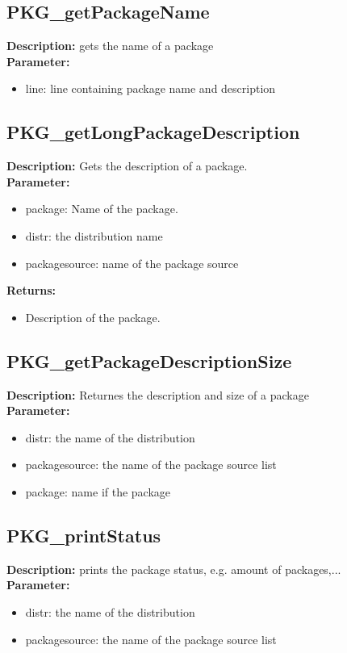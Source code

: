 \subsection{PKG\_getPackageName}
\textbf{Description:} gets the name of a package\\
\textbf{Parameter:}
\begin{itemize}
\item line: line containing package name and description
\end{itemize}

\subsection{PKG\_getLongPackageDescription}
\textbf{Description:} Gets the description of a package.\\
\textbf{Parameter:}
\begin{itemize}
\item package: Name of the package.
\item distr: the distribution name
\item packagesource: name of the package source
\end{itemize}
\textbf{Returns:}
\begin{itemize}
\item Description of the package.
\end{itemize}

\subsection{PKG\_getPackageDescriptionSize}
\textbf{Description:} Returnes the description and size of a package\\
\textbf{Parameter:}
\begin{itemize}
\item distr: the name of the distribution
\item packagesource: the name of the package source list
\item package: name if the package
\end{itemize}

\subsection{PKG\_printStatus}
\textbf{Description:} prints the package status, e.g. amount of packages,...\\
\textbf{Parameter:}
\begin{itemize}
\item distr: the name of the distribution
\item packagesource: the name of the package source list
\end{itemize}

